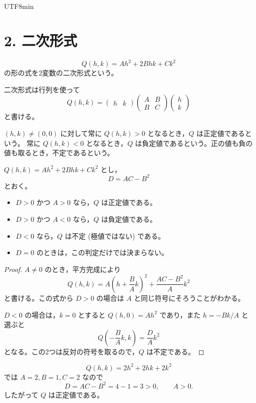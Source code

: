 \documentclass[a4paper,12pt]{article}
\begin{document}
\begin{CJK}{UTF8}{min}
\section*{2. 二次形式}

\begin{definition}
$$
Q(h,k)=Ah^2+2Bhk+Ck^2
$$
の形の式を2変数の二次形式という。
\end{definition}

二次形式は行列を使って
$$
Q(h,k)
=
\begin{pmatrix}h&k\end{pmatrix}
\begin{pmatrix}A&B\\B&C\end{pmatrix}
\begin{pmatrix}h\\k\end{pmatrix}
$$
と書ける。

\begin{definition}
$(h,k)\ne(0,0)$ に対して常に $Q(h,k)>0$ となるとき，$Q$ は正定値であるという。
常に $Q(h,k)<0$ となるとき，$Q$ は負定値であるという。正の値も負の値も取るとき，不定であるという。
\end{definition}

\begin{theorem}[2変数二次形式の符号判定]
$Q(h,k)=Ah^2+2Bhk+Ck^2$ とし，
$$
D=AC-B^2
$$
とおく。
\begin{itemize}
\item $D>0$ かつ $A>0$ なら，$Q$ は正定値である。
\item $D>0$ かつ $A<0$ なら，$Q$ は負定値である。
\item $D<0$ なら，$Q$ は不定 (極値ではない) である。
\item $D=0$ のときは，この判定だけでは決まらない。
\end{itemize}
\end{theorem}

\begin{proof}
$A\ne0$ のとき，平方完成により
$$
Q(h,k)
=A\left(h+\frac{B}{A}k\right)^2
+\frac{AC-B^2}{A}k^2
$$
と書ける。この式から $D>0$ の場合は $A$ と同じ符号にそろうことがわかる。

$D<0$ の場合は，$k=0$ とすると $Q(h,0)=Ah^2$ であり，また $h=-Bk/A$ と選ぶと
$$
Q\left(-\frac{B}{A}k,k\right)=\frac{D}{A}k^2
$$
となる。この2つは反対の符号を取るので，$Q$ は不定である。
\end{proof}

\begin{example}
$$
Q(h,k)=2h^2+2hk+2k^2
$$
では $A=2, B=1, C=2$ なので
$$
D=AC-B^2=4-1=3>0,\qquad A>0.
$$
したがって $Q$ は正定値である。
\end{example}


\end{CJK}
\end{document}
